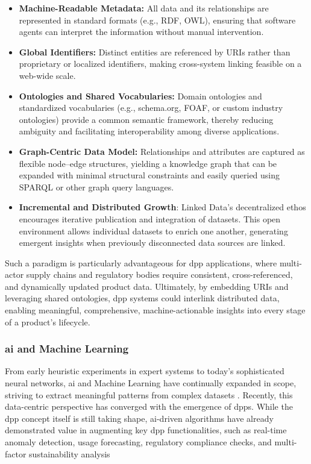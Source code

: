 \begin{itemize}[itemsep=0.5\baselineskip]
    \item \textbf{Machine-Readable Metadata:} All data and its relationships are represented in standard formats (e.g., RDF, OWL), ensuring that software agents can interpret the information without manual intervention. \autocite{BernersLee.2001}

    \item \textbf{Global Identifiers:} Distinct entities are referenced by URIs rather than proprietary or localized identifiers, making cross-system linking feasible on a web-wide scale. \autocite{BernersLee.2006}

    \item \textbf{Ontologies and Shared Vocabularies:} Domain ontologies and standardized vocabularies (e.g., schema.org, FOAF, or custom industry ontologies) provide a common semantic framework, thereby reducing ambiguity and facilitating interoperability among diverse applications. \autocite{Jansen.2025}

    \item \textbf{Graph-Centric Data Model:} Relationships and attributes are captured as flexible node–edge structures, yielding a knowledge graph that can be expanded with minimal structural constraints and easily queried using SPARQL or other graph query languages. \autocite{WorldWideWebConsortium.2014, Hogan.2022}

    \item \textbf{Incremental and Distributed Growth}: Linked Data’s decentralized ethos encourages iterative publication and integration of datasets. This open environment allows individual datasets to enrich one another, generating emergent insights when previously disconnected data sources are linked. \autocite{Heath.2011}
\end{itemize}

Such a paradigm is particularly advantageous for \ac{dpp} applications, where multi-actor supply chains and regulatory bodies require consistent, cross-referenced, and dynamically updated product data. Ultimately, by embedding URIs and leveraging shared ontologies, \ac{dpp} systems could interlink distributed data, enabling meaningful, comprehensive, machine-actionable insights into every stage of a product’s lifecycle. \autocite{Jansen.2025}

\subsubsection*{\ac{ai} and Machine Learning}
From early heuristic experiments in expert systems to today’s sophisticated neural networks, \ac{ai} and Machine Learning have continually expanded in scope, striving to extract meaningful patterns from complex datasets \autocite{Jordan.2015}. Recently, this data-centric perspective has converged with the emergence of \ac{dpp}s. While the \ac{dpp} concept itself is still taking shape, \ac{ai}-driven algorithms have already demonstrated value in augmenting key \ac{dpp} functionalities, such as real-time anomaly detection, usage forecasting, regulatory compliance checks, and multi-factor sustainability analysis \autocite{Tao.2018, Tao.2018b}

